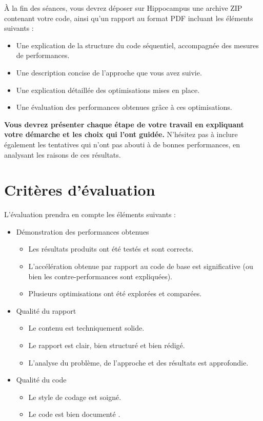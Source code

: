 \documentclass[11pt]{paper}
\begin{document}
À la fin des séances, vous devrez déposer sur Hippocampus une archive ZIP contenant votre code, ainsi qu’un rapport au format PDF incluant les éléments suivants :
\begin{itemize}
	\item Une explication de la structure du code séquentiel, accompagnée des mesures de performances.
	\item Une description concise de l’approche que vous avez suivie.
	\item Une explication détaillée des optimisations mises en place.
	\item Une évaluation des performances obtenues grâce à ces optimisations.
\end{itemize}
\medskip

{\bf Vous devrez présenter chaque étape de votre travail en expliquant votre démarche et les choix qui l’ont guidée.} N’hésitez pas à inclure également les tentatives qui n’ont pas abouti à de bonnes performances, en analysant les raisons de ces résultats.
\medskip

\section*{Critères d'évaluation}

L’évaluation prendra en compte les éléments suivants :
\begin{itemize}
	\item Démonstration des performances obtenues
	\begin{itemize}
		\item Les résultats produits ont été testés et sont corrects.
		\item L’accélération obtenue par rapport au code de base est significative (ou bien les contre-performances sont expliquées).
		\item Plusieurs optimisations ont été explorées et comparées.
	\end{itemize}

	\item Qualité du rapport
	\begin{itemize}
		\item Le contenu est techniquement solide.
		\item Le rapport est clair, bien structuré et bien rédigé.
		\item L’analyse du problème, de l’approche et des résultats est approfondie.
	\end{itemize}
	
	\item Qualité du code
	\begin{itemize}
		\item Le  style de codage est soigné.
		\item Le code est bien documenté .
	\end{itemize}
\end{itemize}
\end{document}
